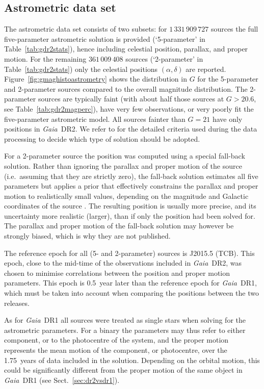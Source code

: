 \documentclass[longauth]{aa_gaia} %
\newcommand\gaia{\textit{Gaia}}
\newcommand\gdr[1]{\gaia~DR#1}
\newcommand\figrefalt[1]{Figure~\ref{#1}}
\newcommand\tabref[1]{Table~\ref{#1}}
\newcommand\gdrtwofivepnum{\ensuremath{1\,331\,909\,727}}
\newcommand\gdrtwotwopnum{\ensuremath{361\,009\,408}}
\begin{document}
\subsection{Astrometric data set} 

The astrometric data set consists of two subsets: for {\gdrtwofivepnum} sources the full
five-parameter astrometric solution is provided (`5-parameter' in \tabref{tab:gdr2stats}), hence
including celestial position, parallax, and proper motion. For the remaining {\gdrtwotwopnum}
sources (`2-parameter' in \tabref{tab:gdr2stats}) only the celestial positions $(\alpha,\delta)$ are
reported. \figrefalt{fig:gmaghistoastrometry} shows the distribution in $G$ for the 5-parameter and
2-parameter sources compared to the overall magnitude distribution. The 2-parameter sources are
typically faint (with about half those sources at $G>20.6$, see \tabref{tab:gdr2magperc}), have very
few observations, or very poorly fit the five-parameter astrometric model. All sources fainter than
$G=21$ have only positions in \gdr{2}. We refer to \cite{DR2-DPACP-51} for the detailed criteria
used during the data processing to decide which type of solution should be adopted.

For a 2-parameter source the position was computed using a special fall-back solution. Rather than
ignoring the parallax and proper motion of the source (i.e.\ assuming that they are strictly zero),
the fall-back solution estimates all five parameters but applies a prior that effectively constrains
the parallax and proper motion to realistically small values, depending on the magnitude and
Galactic coordinates of the source \citep{2015A&A...583A..68M}. The resulting position is usually
more precise, and its uncertainty more realistic (larger), than if only the position had been
solved for. The parallax and proper motion of the fall-back solution may however be strongly biased,
which is why they are not published.

The reference epoch for all (5- and 2-parameter) sources is J2015.5 (TCB).  This epoch, close to the
mid-time of the observations included in \gdr{2}, was chosen to minimise correlations between the
position and proper motion parameters. This epoch is 0.5~year later than the reference epoch for
\gdr{1}, which must be taken into account when comparing the positions between the two releases.

As for \gdr{1} all sources were treated as single stars when solving for the astrometric parameters.
For a binary the parameters may thus refer to either component, or to the photocentre of the system,
and the proper motion represents the mean motion of the component, or photocentre, over the
1.75~years of data included in the solution. Depending on the orbital motion, this could be
significantly different from the proper motion of the same object in \gdr{1} (see
Sect.~\ref{sec:dr2vsdr1}).
\end{document}
